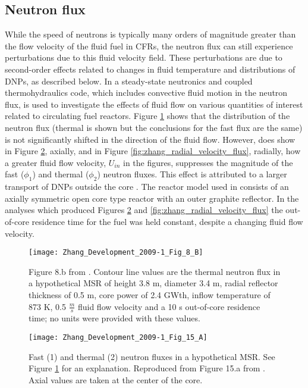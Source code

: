\documentclass[review]{elsarticle}
\begin{document}
\subsection{Neutron flux} \label{ssec:flux}
While the speed of neutrons is typically many orders of magnitude greater than
the flow velocity of the fluid fuel in CFRs, the neutron flux can still experience
perturbations due to this fluid velocity field. These perturbations are due to
second-order effects related to changes in fluid temperature and distributions of
 DNPs, as described below. In \cite{zhang_development_2009-1}
 a steady-state  neutronics and coupled thermohydraulics code, which includes convective
fluid motion in the neutron flux, is used to investigate the effects of fluid
flow on various quantities of interest related to circulating fuel reactors. 
Figure \ref{fig:zhang_2d_flux} \cite{zhang_development_2009-1} shows that the
distribution of the neutron flux (thermal is shown but the conclusions for 
the fast flux are the same) is not significantly shifted in the direction
of the fluid flow. However, \cite{zhang_development_2009-1} does show in 
Figure \ref{fig:zhang_axial_velocity_flux}, axially, and in 
Figure \ref{fig:zhang_radial_velocity_flux}, radially, how a greater fluid flow
 velocity, $U_{in}$ in the figures, suppresses the magnitude of the fast
 ($\phi_{1}$) and thermal ($\phi_{2}$) neutron fluxes. This effect is
 attributed to a larger transport of DNPs outside
 the core \cite{zhang_development_2009-1}. The reactor model
 used in \cite{zhang_development_2009-1} consists of an axially symmetric
 open core type reactor with an outer graphite reflector. In the analyses which
 produced Figures \ref{fig:zhang_axial_velocity_flux} and \ref{fig:zhang_radial_velocity_flux} the
 out-of-core residence time for the fuel was held constant, despite a changing
 fluid flow velocity.

\begin{figure}[H]
   \centering
   \texttt{[image: Zhang\_Development\_2009-1\_Fig\_8\_B]}
   \caption{Figure 8.b from \cite{zhang_development_2009-1}. Contour line
    values are the thermal neutron flux in a hypothetical MSR of height 3.8 m, diameter 3.4 m,
    radial reflector thickness of 0.5 m, core power of 2.4 GWth, inflow temperature of 873 K,
    0.5 $\frac{m}{s}$ fluid flow
    velocity and a 10 s out-of-core residence time; no units were provided with these values.} 
   \label{fig:zhang_2d_flux}
\end{figure}

\begin{figure}[H]
   \centering
   \texttt{[image: Zhang\_Development\_2009-1\_Fig\_15\_A]}
   \caption{Fast (1) and thermal (2) neutron fluxes in a hypothetical MSR. See Figure 
            \ref{fig:zhang_2d_flux} for an explanation. Reproduced from Figure 15.a from
            \cite{zhang_development_2009-1}. 
               Axial
               values are taken at the center of the core.}
   \label{fig:zhang_axial_velocity_flux}
\end{figure}
\end{document}
